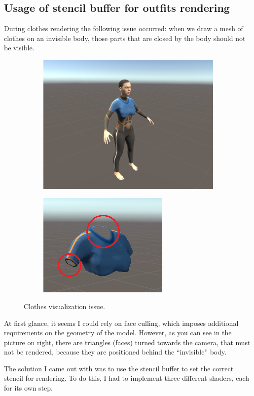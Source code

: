 \documentclass[a4paper]{report}
\begin{document}
\subsection{Usage of stencil buffer for outfits rendering}
\qquad During clothes rendering the following issue occurred: when we draw a mesh of clothes on an invisible body, those parts that are closed by the body should not be visible.


 \begin{figure}[H]
    \begin{subfigure}{\textwidth}
  \includegraphics[width=.465\textwidth, keepaspectratio]{images/ClothesDemos/normal_meshes.png}
   \end{subfigure}%
    \begin{subfigure}{\textwidth}
  \includegraphics[width=.45\textwidth, keepaspectratio]{images/ClothesDemos/normal_outfit_mesh_with_arrows.png}
   \end{subfigure}%
  \caption{Clothes visualization issue.} 
  \label{fig:stencil_err_1}
\end{figure}

At first glance, it seems I could rely on face culling, which imposes additional requirements on the geometry of the model. However, as you can see in the picture on right, there are triangles (faces) turned towards the camera, that must not be rendered, because they are positioned behind the “invisible” body.

The solution I came out with was to use the stencil buffer to set the correct stencil for rendering.
To do this, I had to implement three different shaders, each for its own step.
\end{document}

